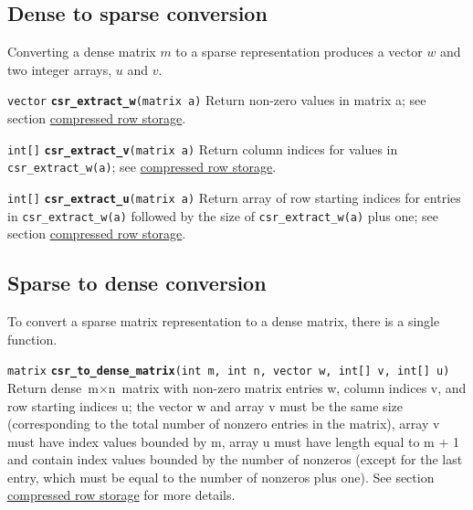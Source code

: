 \documentclass[
  10pt,
]{book}
\begin{document}
\hypertarget{dense-to-sparse-conversion}{%
\subsection{Dense to sparse conversion}\label{dense-to-sparse-conversion}}

Converting a dense matrix \(m\) to a sparse representation produces a
vector \(w\) and two integer arrays, \(u\) and \(v\).


\texttt{vector} \textbf{\texttt{csr\_extract\_w}}\texttt{(matrix\ a)}\newline
Return non-zero values in matrix a; see section \protect\hyperlink{CSR}{compressed row storage}.


\texttt{int{[}{]}} \textbf{\texttt{csr\_extract\_v}}\texttt{(matrix\ a)}\newline
Return column indices for values in \texttt{csr\_extract\_w(a)}; see
\protect\hyperlink{CSR}{compressed row storage}.


\texttt{int{[}{]}} \textbf{\texttt{csr\_extract\_u}}\texttt{(matrix\ a)}\newline
Return array of row starting indices for entries in \texttt{csr\_extract\_w(a)}
followed by the size of \texttt{csr\_extract\_w(a)} plus one; see section
\protect\hyperlink{CSR}{compressed row storage}.

\hypertarget{sparse-to-dense-conversion}{%
\subsection{Sparse to dense conversion}\label{sparse-to-dense-conversion}}

To convert a sparse matrix representation to a dense matrix, there is
a single function.


\texttt{matrix} \textbf{\texttt{csr\_to\_dense\_matrix}}\texttt{(int\ m,\ int\ n,\ vector\ w,\ int{[}{]}\ v,\ int{[}{]}\ u)}\newline
Return dense \(\text{m} \times \text{n}\) matrix with non-zero matrix
entries w, column indices v, and row starting indices u; the vector w
and array v must be the same size (corresponding to the total number of
nonzero entries in the matrix), array v must have index values bounded
by m, array u must have length equal to m + 1 and contain index values
bounded by the number of nonzeros (except for the last entry, which must
be equal to the number of nonzeros plus one). See section
\protect\hyperlink{CSR}{compressed row storage} for more details.
\end{document}
